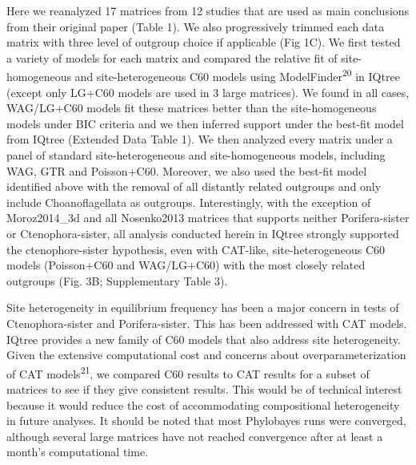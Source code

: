 \documentclass[]{article}
\begin{document}
Here we reanalyzed 17 matrices from 12 studies that are used as main
conclusions from their original paper (Table 1). We also progressively
trimmed each data matrix with three level of outgroup choice if
applicable (Fig 1C). We first tested a variety of models for each matrix
and compared the relative fit of site-homogeneous and site-heterogeneous
C60 models using ModelFinder\textsuperscript{20} in IQtree (except only
LG+C60 models are used in 3 large matrices). We found in all cases,
WAG/LG+C60 models fit these matrices better than the site-homogeneous
models under BIC criteria and we then inferred support under the
best-fit model from IQtree (Extended Data Table 1). We then analyzed
every matrix under a panel of standard site-heterogeneous and
site-homogeneous models, including WAG, GTR and Poisson+C60. Moreover,
we also used the best-fit model identified above with the removal of all
distantly related outgroups and only include Choanoflagellata as
outgroups. Interestingly, with the exception of Moroz2014\_3d and all
Nosenko2013 matrices that supports neither Porifera-sister or
Ctenophora-sister, all analysis conducted herein in IQtree strongly
supported the ctenophore-sister hypothesis, even with CAT-like,
site-heterogeneous C60 models (Poisson+C60 and WAG/LG+C60) with the most
closely related outgroups (Fig. 3B; Supplementary Table 3).

Site heterogeneity in equilibrium frequency has been a major concern in
tests of Ctenophora-sister and Porifera-sister. This has been addressed
with CAT models. IQtree provides a new family of C60 models that also
address site heterogeneity. Given the extensive computational cost and
concerns about overparameterization of CAT models\textsuperscript{21},
we compared C60 results to CAT results for a subset of matrices to see
if they give consistent results. This would be of technical interest
because it would reduce the cost of accommodating compositional
heterogeneity in future analyses. It should be noted that most
Phylobayes runs were converged, although several large matrices have not
reached convergence after at least a month's computational time.
\end{document}
